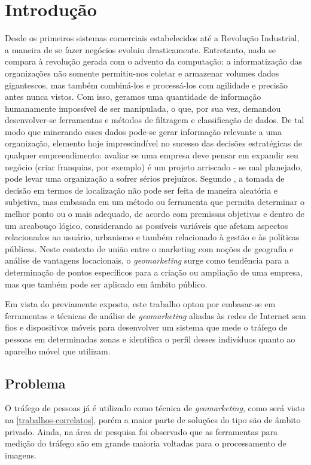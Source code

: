 
\chapter{Introdução}
\label{introducao}

Desde os primeiros sistemas comerciais estabelecidos até a Revolução Industrial,
a maneira de se fazer negócios evoluiu drasticamente. Entretanto, nada se
compara à revolução gerada com o advento da computação: a informatização das
organizações não somente permitiu-nos coletar e armazenar volumes dados
gigantescos, mas também combiná-los e processá-los com agilidade e precisão antes nunca
vistos. Com isso, geramos uma quantidade de informação humanamente impossível de
ser manipulada, o que, por sua vez, demandou desenvolver-se ferramentas e
métodos de filtragem e classificação de dados. De tal modo que minerando esses dados pode-se gerar
informação relevante a uma organização, elemento hoje imprescindível no sucesso
das decisões estratégicas de qualquer empreendimento: avaliar se uma empresa
deve pensar em expandir seu negócio (criar franquias, por exemplo) é um projeto
arriscado - se mal planejado, pode levar uma organização a sofrer sérios
prejuízos. Segundo , a tomada de decisão em termos de
localização não pode ser feita de maneira aleatória e subjetiva, mas embasada em
um método ou ferramenta que permita determinar o melhor ponto ou o mais
adequado, de acordo com premissas objetivas e dentro de um arcabouço lógico,
considerando as possíveis variáveis que afetam aspectos relacionados ao usuário,
urbanismo e também relacionado à gestão e às políticas públicas. Neste contexto
de união entre o marketing com noções de geografia e análise de vantagens
locacionais, o \emph{geomarketing} surge como tendência para a determinação de
pontos específicos para a criação ou ampliação de uma empresa, mas que também pode ser aplicado em âmbito público.

Em vista do previamente exposto, este trabalho optou por embasar-se em
ferramentas e técnicas de análise de \emph{geomarketing} aliadas às redes de
Internet sem fios e dispositivos móveis para desenvolver
um sistema que mede o tráfego de pessoas em determinadas zonas e identifica o
perfil desses indivíduos quanto ao aparelho móvel que utilizam.

\section{Problema}
O tráfego de pessoas já é utilizado como técnica de \emph{geomarketing}, como será visto na \autoref{trabalhos-correlatos}, porém
a maior parte de soluções do tipo são de âmbito privado. Ainda, na área de pesquisa foi observado que as ferramentas para medição do tráfego
são em grande maioria voltadas para o processamento de imagens.

